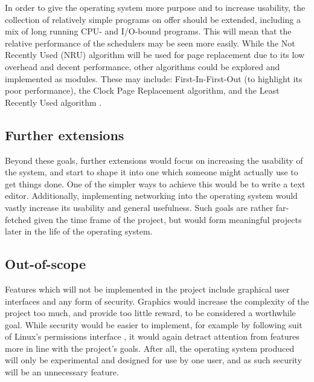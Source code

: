 \documentclass[10pt,a4paper]{article}
\begin{document}
In order to give the operating system more purpose and to increase usability,
the collection of relatively simple programs on offer should be extended,
including a mix of long running CPU- and I/O-bound programs. This will mean that
the relative performance of the schedulers may be seen more easily. While the
Not Recently Used (NRU) algorithm will be used for page replacement due to its
low overhead and decent performance, other algorithms could be explored and
implemented as modules. These may include: First-In-First-Out (to highlight its
poor performance), the Clock Page Replacement algorithm, and the Least Recently
Used algorithm \cite{PageReplacement}.

\subsection*{Further extensions}
Beyond these goals, further extensions would focus on increasing the usability
of the system, and start to shape it into one which someone might actually use
to get things done. One of the simpler ways to achieve this would be to write a
text editor. Additionally, implementing networking into the operating system
would vastly increase its usability and general usefulness. Such goals are
rather far-fetched given the time frame of the project, but would form
meaningful projects later in the life of the operating system.

\subsection*{Out-of-scope}
Features which will not be implemented in the project include graphical user
interfaces and any form of security. Graphics would increase the complexity of
the project too much, and provide too little reward, to be considered a
worthwhile goal. While security would be easier to implement, for example by
following suit of Linux's permissions interface \cite{permissions}, it would
again detract attention from features more in line with the project's goals.
After all, the operating system produced will only be experimental and designed
for use by one user, and as such security will be an unnecessary feature.
\end{document}
